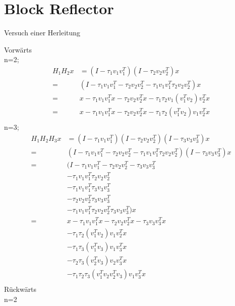 \chapter{Block Reflector}
Versuch einer Herleitung

Vorwärts \\
n=2;
\begin{align*}
	H_1 H_2 x &= (I-\tau_1 v_1 v_1^T)(I-\tau_2 v_2 v_2^T)x\\
	= &(I - \tau_1 v_1 v_1^T - \tau_2 v_2 v_2^T -  \tau_1 v_1 v_1^T \tau_2 v_2 v_2^T )x\\
  = &x - \tau_1 v_1 v_1^T x - \tau_2 v_2 v_2^T x - \tau_1 \tau_2 v_1 (v_1^T v_2 )v_2^T x\\
  = &x - \tau_1 v_1 v_1^T x - \tau_2 v_2 v_2^T x - \tau_1 \tau_2 (v_1^T v_2 ) v_1 v_2^T x\\
\end{align*}
n=3;
\begin{align*}
	H_1 H_2 H_3 x &= (I-\tau_1 v_1 v_1^T)(I-\tau_2 v_2 v_2^T)(I-\tau_3 v_3 v_3^T)x\\
	= &(I - \tau_1 v_1 v_1^T - \tau_2 v_2 v_2^T -  \tau_1 v_1 v_1^T \tau_2 v_2 v_2^T )(I-\tau_3 v_3 v_3^T)x\\
	= &(I - \tau_1 v_1 v_1^T - \tau_2 v_2 v_2^T - \tau_3 v_3 v_3^T \\
	&- \tau_1 v_1 v_1^T \tau_2 v_2 v_2^T \\
	&- \tau_1 v_1 v_1^T \tau_3 v_3 v_3^T\\
	&- \tau_2 v_2 v_2^T \tau_3 v_3 v_3^T\\
	&- \tau_1 v_1 v_1^T \tau_2 v_2 v_2^T \tau_3 v_3 v_3^T )x \\
	= &x - \tau_1 v_1 v_1^Tx - \tau_2 v_2 v_2^Tx - \tau_3 v_3 v_3^Tx \\
    &- \tau_1 \tau_2  (v_1^T v_2) v_1  v_2^T x\\
	&- \tau_1 \tau_3  (v_1^T v_3) v_1  v_3^T x\\
	&- \tau_2 \tau_3  (v_2^T v_3) v_2  v_3^T x\\
    &- \tau_1 \tau_2  \tau_3 (v_1^T v_2 v_2^T v_3) v_1  v_3^T x \\
\end{align*}
Rückwärts\\
n=2
